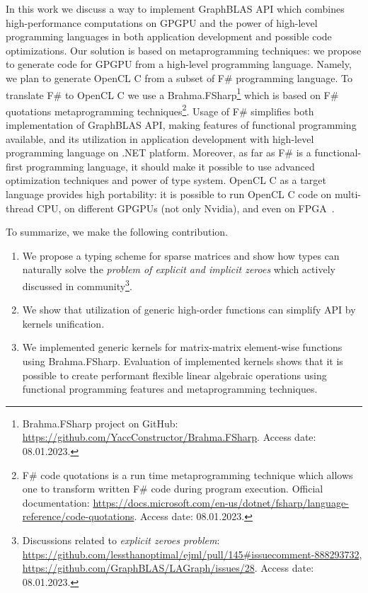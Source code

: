 In this work we discuss a way to implement GraphBLAS API which combines high-performance computations on GPGPU and the power of high-level programming languages in both application development and possible code optimizations.
Our solution is based on metaprogramming techniques: we propose to generate code for GPGPU from a high-level programming language.
Namely, we plan to generate OpenCL C from a subset of  F\# programming language.
To translate F\# to OpenCL C we use a Brahma.FSharp\footnote{Brahma.FSharp project on GitHub: \url{https://github.com/YaccConstructor/Brahma.FSharp}. Access date: 08.01.2023.} which is based on F\# quotations metaprogramming techniques\footnote{F\# code quotations is a run time metaprogramming technique which allows one to transform written F\# code during program execution. Official documentation: \url{https://docs.microsoft.com/en-us/dotnet/fsharp/language-reference/code-quotations}. Access date: 08.01.2023.}.
Usage of F\# simplifies both implementation of GraphBLAS API, making features of functional programming available, and its utilization in application development with high-level programming language on .NET platform. 
Moreover, as far as F\# is a functional-first programming language, it should make it possible to use advanced optimization techniques and power of type system.
OpenCL C as a target language provides high portability: it is possible to run OpenCL C code on multi-thread CPU, on different GPGPUs (not only Nvidia), and even on FPGA~\cite{kenter2019invited, 6567546}.

To summarize, we make the following contribution.
\begin{enumerate}
    \item We propose a typing scheme for sparse matrices and show how types can naturally solve the \textit{problem of explicit and implicit zeroes} which actively discussed in community\footnote{Discussions related to \textit{explicit zeroes problem}: \url{https://github.com/lessthanoptimal/ejml/pull/145\#issuecomment-888293732}, \url{https://github.com/GraphBLAS/LAGraph/issues/28}. Access date: 08.01.2023.}.
    \item We show that utilization of generic high-order functions can simplify API by kernels unification.
    \item We implemented generic kernels for matrix-matrix element-wise functions using Brahma.FSharp. 
    Evaluation of implemented kernels shows that it is possible to create performant flexible linear algebraic operations using functional programming features and metaprogramming techniques.
\end{enumerate}   